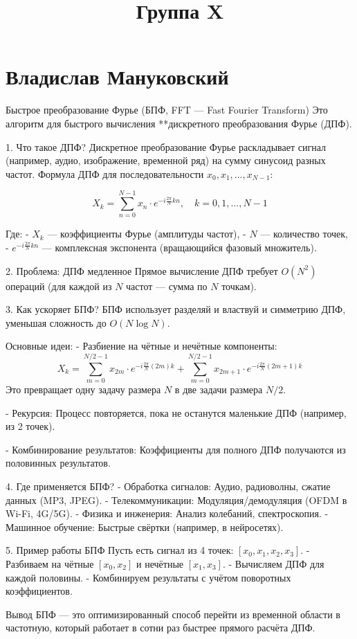 \documentclass{article}
\title{Группа X}
\begin{document}
\section*{Владислав Мануковский}

Быстрое преобразование Фурье (БПФ, FFT — Fast Fourier Transform)
Это алгоритм для быстрого вычисления **дискретного преобразования Фурье (ДПФ).

1. Что такое ДПФ?  
Дискретное преобразование Фурье раскладывает сигнал (например, аудио, изображение, временной ряд) на сумму синусоид разных частот.  
Формула ДПФ для последовательности \( x_0, x_1, \dots, x_{N-1} \):  

\[
X_k = \sum_{n=0}^{N-1} x_n \cdot e^{-i \frac{2\pi}{N} kn}, \quad k = 0, 1, \dots, N-1
\]  

Где:  
- \( X_k \) — коэффициенты Фурье (амплитуды частот),  
- \( N \) — количество точек,  
- \( e^{-i \frac{2\pi}{N} kn} \) — комплексная экспонента (вращающийся фазовый множитель).  

2. Проблема: ДПФ медленное  
Прямое вычисление ДПФ требует \( O(N^2) \) операций (для каждой из \( N \) частот — сумма по \( N \) точкам).  

3. Как ускоряет БПФ? 
БПФ использует разделяй и властвуй и симметрию ДПФ, уменьшая сложность до \( O(N \log N) \).  

Основные идеи:  
- Разбиение на чётные и нечётные компоненты:  
\[
X_k = \sum_{m=0}^{N/2-1} x_{2m} \cdot e^{-i \frac{2\pi}{N} (2m)k} + \sum_{m=0}^{N/2-1} x_{2m+1} \cdot e^{-i \frac{2\pi}{N} (2m+1)k}
\]  
Это превращает одну задачу размера \( N \) в две задачи размера \( N/2 \).  

- Рекурсия: Процесс повторяется, пока не останутся маленькие ДПФ (например, из 2 точек).  

- Комбинирование результатов: Коэффициенты для полного ДПФ получаются из половинных результатов.  

4. Где применяется БПФ?  
- Обработка сигналов: Аудио, радиоволны, сжатие данных (MP3, JPEG).  
- Телекоммуникации: Модуляция/демодуляция (OFDM в Wi-Fi, 4G/5G).  
- Физика и инженерия: Анализ колебаний, спектроскопия.  
- Машинное обучение: Быстрые свёртки (например, в нейросетях).  

5. Пример работы БПФ 
Пусть есть сигнал из 4 точек: \( [x_0, x_1, x_2, x_3] \).  
- Разбиваем на чётные \( [x_0, x_2] \) и нечётные \( [x_1, x_3] \).  
- Вычисляем ДПФ для каждой половины.  
- Комбинируем результаты с учётом поворотных коэффициентов.  

Вывод  
БПФ — это оптимизированный способ перейти из временной области в частотную, который работает в сотни раз быстрее прямого расчёта ДПФ.  
\end{document}
